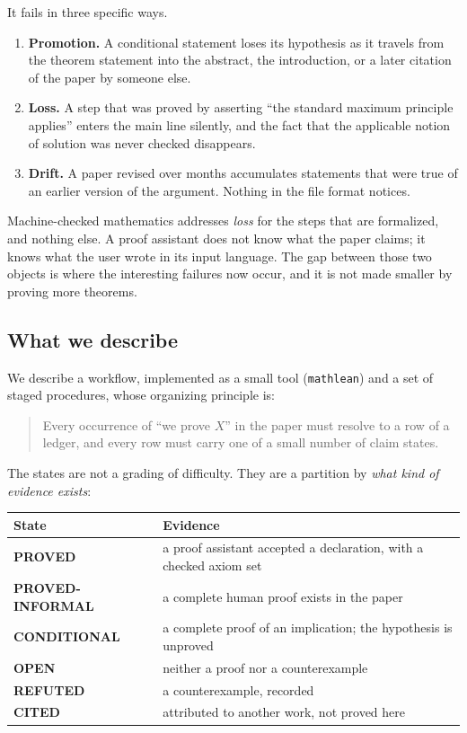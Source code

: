 \documentclass[11pt]{article}
\newcommand{\claim}[1]{\textbf{#1}}
\newcommand{\code}[1]{\texttt{#1}}
\begin{document}
It fails in three specific ways.

\begin{enumerate}
\item \textbf{Promotion.} A conditional statement loses its hypothesis as it
  travels from the theorem statement into the abstract, the introduction, or a
  later citation of the paper by someone else.
\item \textbf{Loss.} A step that was proved by asserting ``the standard
  maximum principle applies'' enters the main line silently, and the fact that
  the applicable notion of solution was never checked disappears.
\item \textbf{Drift.} A paper revised over months accumulates statements that
  were true of an earlier version of the argument. Nothing in the file format
  notices.
\end{enumerate}

Machine-checked mathematics addresses \emph{loss} for the steps that are
formalized, and nothing else. A proof assistant does not know what the paper
claims; it knows what the user wrote in its input language. The gap between
those two objects is where the interesting failures now occur, and it is not
made smaller by proving more theorems.

\subsection{What we describe}

We describe a workflow, implemented as a small tool (\code{mathlean}) and a
set of staged procedures, whose organizing principle is:

\begin{quote}
Every occurrence of ``we prove $X$'' in the paper must resolve to a row of a
ledger, and every row must carry one of a small number of claim states.
\end{quote}

The states are not a grading of difficulty. They are a partition by
\emph{what kind of evidence exists}:

\begin{center}
\begin{tabular}{@{}ll@{}}
\toprule
State & Evidence \\
\midrule
\claim{PROVED} & a proof assistant accepted a declaration, with a checked axiom set \\
\claim{PROVED-INFORMAL} & a complete human proof exists in the paper \\
\claim{CONDITIONAL} & a complete proof of an implication; the hypothesis is unproved \\
\claim{OPEN} & neither a proof nor a counterexample \\
\claim{REFUTED} & a counterexample, recorded \\
\claim{CITED} & attributed to another work, not proved here \\
\bottomrule
\end{tabular}
\end{center}
\end{document}
